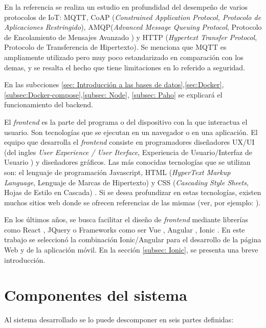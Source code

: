 En la referencia \citep{ARTICLE:2} se realiza un estudio en profundidad del desempeño de varios protocolos de IoT: MQTT, CoAP (\textit{Constrained Application Protocol, Protocolo de Aplicaciones Restringido}), AMQP(\textit{Advanced Message Queuing Protocol}, Protocolo de Encolamiento de Mensajes Avanzado ) y HTTP (\textit{Hypertext Transfer Protocol}, Protocolo de Transferencia de Hipertexto). Se menciona que MQTT es ampliamente utilizado pero muy poco estandarizado en comparación con los demas, y se resalta el hecho que tiene limitaciones en lo referido a seguridad.

En las subcciones \ref{sec: Introducción a las bases de datos},\ref{sec:Docker},\ref{subsec:Docker-compose},\ref{subsec: Node}, \ref{subsec: Paho} se explicará el funcionamiento del backend.

El \textit{frontend} es la parte del programa o del dispositivo con la que interactua el usuario. Son tecnologías que se ejecutan en un navegador o en una aplicación. El equipo que desarrolla el \textit{frontend} consiste en programadores diseñadores UX/UI (del ingles \textit{User Experience / User Iterface}, Experiencia de Usuario/Interfaz de Usuario ) y diseñadores gráficos. Las más conocidas tecnologías que se utilizan son: el lenguaje de programación Javascript, HTML (\textit{HyperText Markup Language}, Lenguaje de Marcas de Hipertexto) y CSS (\textit{Cascading Style Sheets}, Hojas de Estilo en Cascada) \citep{ARTICLE:4}. Si se desea profundizar en estas tecnologías, existen muchos sitios web donde se ofrecen referencias de las mismas (ver, por ejemplo: \citep{WEBSITE:13}).  

En los últimos años, se busca facilitar el diseño de  \textit{frontend} mediante librerías como React \citep{WEBSITE:14},  JQuery \citep{WEBSITE:17} o Frameworks como ser Vue \citep{WEBSITE:15}, Angular \citep{WEBSITE:16}, Ionic \citep{WEBSITE:18}. En este trabajo se seleccionó la combinación Ionic/Angular para el desarrollo de la página Web y de la aplicación móvil. En la sección \ref{subsec: Ionic}, se presenta una breve introducción.

\section{Componentes del sistema}
\label{sec:Sistema General}

Al sistema desarrollado se lo puede descomponer en seis partes definidas:

